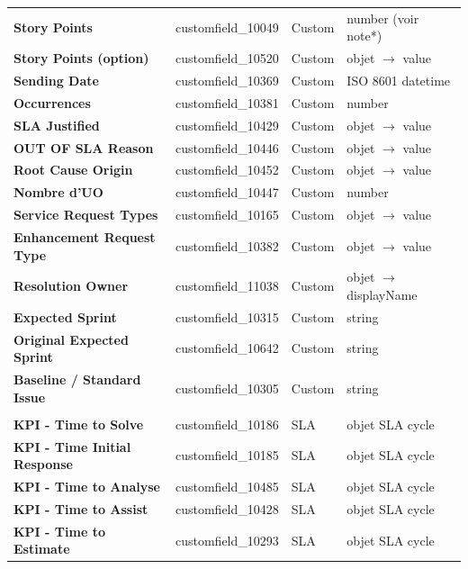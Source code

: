 \documentclass[12pt, a4paper]{article}
\begin{document}
\begin{longtable}{>{\bfseries\small}p{4.8cm}
                  >{\ttfamily\small}p{4.8cm}
                  >{\small}p{2.2cm}
                  >{\small}p{2.4cm}}
  Story Points               & customfield\_10049    & Custom & number (voir note*) \\
  Story Points (option)      & customfield\_10520    & Custom & objet $\to$ value \\
  Sending Date               & customfield\_10369    & Custom & ISO 8601 datetime \\
  Occurrences                & customfield\_10381    & Custom & number \\
  SLA Justified              & customfield\_10429    & Custom & objet $\to$ value \\
  OUT OF SLA Reason          & customfield\_10446    & Custom & objet $\to$ value \\
  Root Cause Origin          & customfield\_10452    & Custom & objet $\to$ value \\
  Nombre d'UO                & customfield\_10447    & Custom & number \\
  Service Request Types      & customfield\_10165    & Custom & objet $\to$ value \\
  Enhancement Request Type   & customfield\_10382    & Custom & objet $\to$ value \\
  Resolution Owner           & customfield\_11038    & Custom & objet $\to$ displayName \\
  Expected Sprint            & customfield\_10315    & Custom & string \\
  Original Expected Sprint   & customfield\_10642    & Custom & string \\
  Baseline / Standard Issue  & customfield\_10305    & Custom & string \\[6pt]

  \multicolumn{4}{l}{\textit{\color{dxcpurple}Champs SLA (retournés comme objets complexes)}} \\[3pt]
  KPI - Time to Solve        & customfield\_10186    & SLA & objet SLA cycle \\
  KPI - Time Initial Response & customfield\_10185   & SLA & objet SLA cycle \\
  KPI - Time to Analyse      & customfield\_10485    & SLA & objet SLA cycle \\
  KPI - Time to Assist       & customfield\_10428    & SLA & objet SLA cycle \\
  KPI - Time to Estimate     & customfield\_10293    & SLA & objet SLA cycle \\

\end{longtable}
\end{document}

